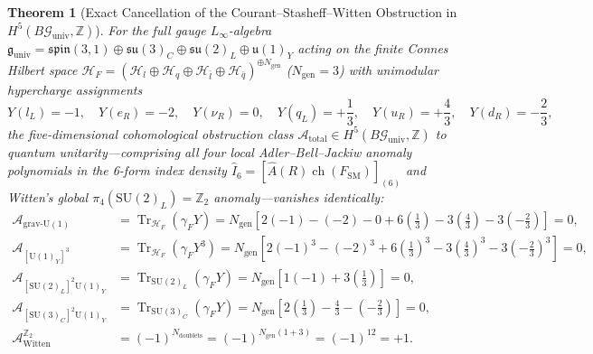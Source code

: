\documentclass[11pt,a4paper]{article}
\theoremstyle{plain}
\newtheorem{theorem}{Theorem}[section]
\theoremstyle{definition}
\theoremstyle{remark}
\newcommand{\Tr}{\operatorname{Tr}}
\newcommand{\SU}{\mathrm{SU}}
\newcommand{\U}{\mathrm{U}}
\newcommand{\Hilb}{\mathcal{H}}
\newcommand{\Z}{\mathbb{Z}}
\begin{document}
\begin{theorem}[Exact Cancellation of the Courant--Stasheff--Witten Obstruction in $H^5(B\mathcal{G}_{\mathrm{univ}}, \Z)$]
\label{thm:anomalies}
For the full gauge $L_\infty$-algebra $\mathfrak{g}_{\mathrm{univ}} = \mathfrak{spin}(3,1) \oplus \allowbreak \mathfrak{su}(3)_C \oplus \mathfrak{su}(2)_L \oplus \mathfrak{u}(1)_Y$ acting on the finite Connes Hilbert space $\Hilb_F = (\Hilb_l \oplus \Hilb_q \oplus \Hilb_{\bar{l}} \oplus \Hilb_{\bar{q}})^{\oplus N_{\mathrm{gen}}}$ ($N_{\mathrm{gen}} = 3$) with unimodular hypercharge assignments
\begin{equation}
  Y(l_L) = -1, \quad Y(e_R) = -2, \quad Y(\nu_R) = 0, \quad Y(q_L) = +\frac{1}{3}, \quad Y(u_R) = +\frac{4}{3}, \quad Y(d_R) = -\frac{2}{3},
\end{equation}
the five-dimensional cohomological obstruction class $\mathcal{A}_{\mathrm{total}} \in H^5(B\mathcal{G}_{\mathrm{univ}}, \Z)$ to quantum unitarity---comprising all four local Adler--Bell--Jackiw anomaly polynomials in the 6-form index density $\hat{I}_6 = [\hat{A}(R)\operatorname{ch}(F_{\mathrm{SM}})]_{(6)}$ and Witten's global $\pi_4(\SU(2)_L) = \Z_2$ anomaly---vanishes identically:
\begin{align}
  \mathcal{A}_{\mathrm{grav}\text{-}\U(1)} &= \Tr_{\Hilb_F}(\gamma_F Y) = N_{\mathrm{gen}}\left[ 2(-1) - (-2) - 0 + 6\left(\frac{1}{3}\right) - 3\left(\frac{4}{3}\right) - 3\left(-\frac{2}{3}\right) \right] = 0, \label{eq:anom1} \\
  \mathcal{A}_{[\U(1)_Y]^3} &= \Tr_{\Hilb_F}(\gamma_F Y^3) = N_{\mathrm{gen}}\left[ 2(-1)^3 - (-2)^3 + 6\left(\frac{1}{3}\right)^3 - 3\left(\frac{4}{3}\right)^3 - 3\left(-\frac{2}{3}\right)^3 \right] = 0, \label{eq:anom2} \\
  \mathcal{A}_{[\SU(2)_L]^2\U(1)_Y} &= \Tr_{\SU(2)_L}(\gamma_F Y) = N_{\mathrm{gen}}\left[ 1(-1) + 3\left(\frac{1}{3}\right) \right] = 0, \label{eq:anom3} \\
  \mathcal{A}_{[\SU(3)_C]^2\U(1)_Y} &= \Tr_{\SU(3)_C}(\gamma_F Y) = N_{\mathrm{gen}}\left[ 2\left(\frac{1}{3}\right) - \frac{4}{3} - \left(-\frac{2}{3}\right) \right] = 0, \label{eq:anom4} \\
  \mathcal{A}_{\mathrm{Witten}}^{\Z_2} &= (-1)^{N_{\mathrm{doublets}}} = (-1)^{N_{\mathrm{gen}}(1 + 3)} = (-1)^{12} = +1. \label{eq:anom5}
\end{align}
\end{theorem}
\end{document}
